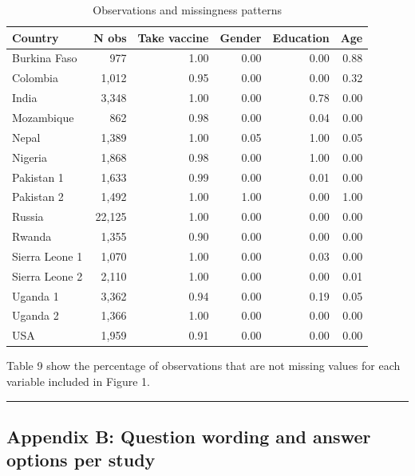 \documentclass[
  12pt,
]{article}
\begin{document}
\begin{table}

\caption{Observations and missingness patterns}
\centering
\fontsize{10}{12}\selectfont
\begin{threeparttable}
\begin{tabular}[t]{lrrrrr}
\toprule
Country & N obs & Take vaccine & Gender & Education & Age\\
\midrule
Burkina Faso & 977 & 1.00 & 0.00 & 0.00 & 0.88\\
Colombia & 1,012 & 0.95 & 0.00 & 0.00 & 0.32\\
India & 3,348 & 1.00 & 0.00 & 0.78 & 0.00\\
Mozambique & 862 & 0.98 & 0.00 & 0.04 & 0.00\\
Nepal & 1,389 & 1.00 & 0.05 & 1.00 & 0.05\\
Nigeria & 1,868 & 0.98 & 0.00 & 1.00 & 0.00\\
Pakistan 1 & 1,633 & 0.99 & 0.00 & 0.01 & 0.00\\
Pakistan 2 & 1,492 & 1.00 & 1.00 & 0.00 & 1.00\\
Russia & 22,125 & 1.00 & 0.00 & 0.00 & 0.00\\
Rwanda & 1,355 & 0.90 & 0.00 & 0.00 & 0.00\\
Sierra Leone 1 & 1,070 & 1.00 & 0.00 & 0.03 & 0.00\\
Sierra Leone 2 & 2,110 & 1.00 & 0.00 & 0.00 & 0.01\\
Uganda 1 & 3,362 & 0.94 & 0.00 & 0.19 & 0.05\\
Uganda 2 & 1,366 & 1.00 & 0.00 & 0.00 & 0.00\\
USA & 1,959 & 0.91 & 0.00 & 0.00 & 0.00\\
\bottomrule
\end{tabular}
\begin{tablenotes}
\item Table 9 show the percentage of observations that are not missing values for each variable included in Figure 1.
\end{tablenotes}
\end{threeparttable}
\end{table}

\begin{center}\rule{0.5\linewidth}{0.5pt}\end{center}

\pagebreak

\hypertarget{appendixb}{%
\subsection*{Appendix B: Question wording and answer options per study}\label{appendixb}}
\end{document}
